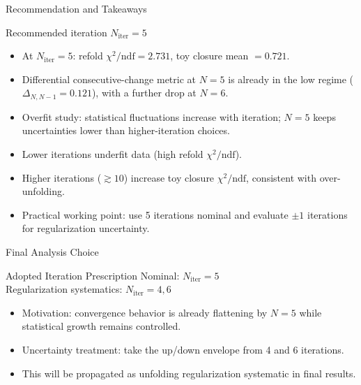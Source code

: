 \documentclass[aspectratio=169]{beamer}
\begin{document}
\begin{frame}{Recommendation and Takeaways}
\begin{block}{Recommended iteration}
\centering
\Large \textbf{$N_{\mathrm{iter}}=5$}
\end{block}

\begin{itemize}
  \item At $N_{\mathrm{iter}}=5$: refold $\chi^2/\mathrm{ndf}=2.731$, toy closure mean $=0.721$.
  \item Differential consecutive-change metric at $N=5$ is already in the low regime ($\Delta_{N,N-1}=0.121$), with a further drop at $N=6$.
  \item Overfit study: statistical fluctuations increase with iteration; $N=5$ keeps uncertainties lower than higher-iteration choices.
  \item Lower iterations underfit data (high refold $\chi^2/\mathrm{ndf}$).
  \item Higher iterations ($\gtrsim 10$) increase toy closure $\chi^2/\mathrm{ndf}$, consistent with over-unfolding.
  \item Practical working point: use 5 iterations nominal and evaluate $\pm1$ iterations for regularization uncertainty.
\end{itemize}
\end{frame}

\begin{frame}{Final Analysis Choice}
\begin{block}{Adopted Iteration Prescription}
\centering
\Large Nominal: \textbf{$N_{\mathrm{iter}}=5$} \\
\Large Regularization systematics: \textbf{$N_{\mathrm{iter}}=4,6$}
\end{block}
\begin{itemize}
  \item Motivation: convergence behavior is already flattening by $N=5$ while statistical growth remains controlled.
  \item Uncertainty treatment: take the up/down envelope from 4 and 6 iterations.
  \item This will be propagated as unfolding regularization systematic in final results.
\end{itemize}
\end{frame}
\end{document}
